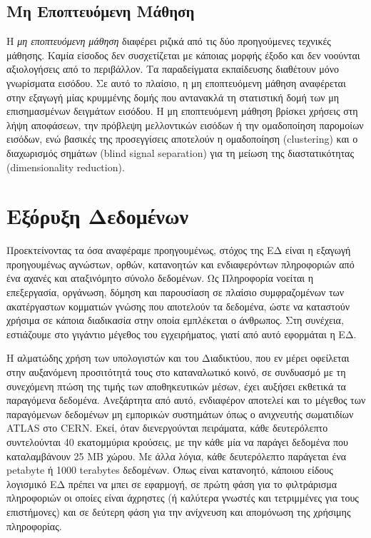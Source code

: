 \subsection{Μη Εποπτευόμενη Μάθηση}
Η \emph{μη εποπτευόμενη μάθηση} διαφέρει ριζικά από τις δύο προηγούμενες τεχνικές μάθησης. Καμία είσοδος δεν συσχετίζεται με κάποιας μορφής έξοδο και δεν νοούνται αξιολογήσεις από το περιβάλλον. Τα παραδείγματα εκπαίδευσης διαθέτουν μόνο γνωρίσματα εισόδου. Σε αυτό το πλαίσιο, η μη εποπτευόμενη μάθηση αναφέρεται στην εξαγωγή μίας κρυμμένης δομής που αντανακλά τη στατιστική δομή των μη επισημασμένων δειγμάτων εισόδου. Η μη εποπτευόμενη μάθηση βρίσκει χρήσεις στη λήψη αποφάσεων, την πρόβλεψη μελλοντικών εισόδων ή την ομαδοποίηση παρομοίων εισόδων, ενώ βασικές της προσεγγίσεις αποτελούν η ομαδοποίηση (clustering) και ο διαχωρισμός σημάτων (blind signal separation) για τη μείωση της διαστατικότητας (dimensionality reduction).

\section{Εξόρυξη Δεδομένων}
Προεκτείνοντας τα όσα αναφέραμε προηγουμένως, στόχος της ΕΔ είναι η εξαγωγή προηγουμένως αγνώστων, ορθών, κατανοητών και ενδιαφερόντων πληροφοριών από ένα αχανές και αταξινόμητο σύνολο δεδομένων. Ως Πληροφορία νοείται η επεξεργασία, οργάνωση, δόμηση και παρουσίαση σε πλαίσιο συμφραζομένων των ακατέργαστων κομματιών γνώσης που αποτελούν τα δεδομένα, ώστε να καταστούν χρήσιμα σε κάποια διαδικασία στην οποία εμπλέκεται ο άνθρωπος. Στη συνέχεια, εστιάζουμε στο γιγάντιο μέγεθος του εγχειρήματος, γιατί από αυτό εφορμάται η ΕΔ. 

Η αλματώδης χρήση των υπολογιστών και του Διαδικτύου, που εν μέρει οφείλεται στην αυξανόμενη προσιτότητά τους στο καταναλωτικό κοινό, σε συνδυασμό με τη συνεχόμενη πτώση της τιμής των αποθηκευτικών μέσων, έχει αυξήσει εκθετικά τα παραγόμενα δεδομένα.  Ανεξάρτητα από αυτό, ενδιαφέρον αποτελεί και το μέγεθος των παραγόμενων δεδομένων μη εμπορικών συστημάτων όπως ο ανιχνευτής σωματιδίων ATLAS στο CERN. Εκεί, όταν διενεργούνται πειράματα, κάθε δευτερόλεπτο συντελούνται 40 εκατομμύρια κρούσεις, με την κάθε μία να παράγει δεδομένα που καταλαμβάνουν 25 MB χώρου. Με άλλα λόγια, κάθε δευτερόλεπτο παράγεται ένα petabyte ή 1000 terabytes δεδομένων. Όπως είναι κατανοητό, κάποιου είδους λογισμικό ΕΔ πρέπει να μπει σε εφαρμογή, σε πρώτη φάση για το φιλτράρισμα πληροφοριών οι οποίες είναι άχρηστες (ή καλύτερα γνωστές και τετριμμένες για τους επιστήμονες) και σε δεύτερη φάση για την ανίχνευση και απομόνωση της χρήσιμης πληροφορίας.


